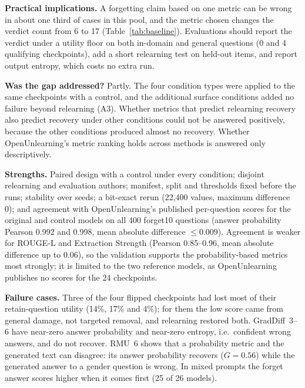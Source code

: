 \documentclass[conference]{IEEEtran}
\begin{document}
\textbf{Practical implications.} A forgetting claim based on one metric can be wrong in about one third of cases in this pool, and the metric chosen changes the verdict count from 6 to 17 (Table~\ref{tab:baseline}). Evaluations should report the verdict under a utility floor on both in-domain and general questions (0 and 4 qualifying checkpoints), add a short relearning test on held-out items, and report output entropy, which costs no extra run.

\textbf{Was the gap addressed?} Partly. The four condition types were applied to the same checkpoints with a control, and the additional surface conditions added no failure beyond relearning (A3). Whether metrics that predict relearning recovery also predict recovery under other conditions could not be answered positively, because the other conditions produced almost no recovery. Whether OpenUnlearning's metric ranking holds across methods is answered only descriptively.

\textbf{Strengths.} Paired design with a control under every condition; disjoint relearning and evaluation authors; manifest, split and thresholds fixed before the runs; stability over seeds; a bit-exact rerun (22,400 values, maximum difference 0); and agreement with OpenUnlearning's published per-question scores for the original and control models on all 400 forget10 questions (answer probability Pearson 0.992 and 0.998, mean absolute difference $\le0.009$). Agreement is weaker for ROUGE-L and Extraction Strength (Pearson 0.85--0.96, mean absolute difference up to 0.06), so the validation supports the probability-based metrics most strongly; it is limited to the two reference models, as OpenUnlearning publishes no scores for the 24 checkpoints.

\textbf{Failure cases.} Three of the four flipped checkpoints had lost most of their retain-question utility (14\%, 17\% and 4\%); for them the low score came from general damage, not targeted removal, and relearning restored both. GradDiff~3--6 have near-zero answer probability and near-zero entropy, i.e.\ confident wrong answers, and do not recover. RMU~6 shows that a probability metric and the generated text can disagree: its answer probability recovers ($G=0.56$) while the generated answer to a gender question is wrong. In mixed prompts the forget answer scores higher when it comes first (25 of 26 models).
\end{document}
